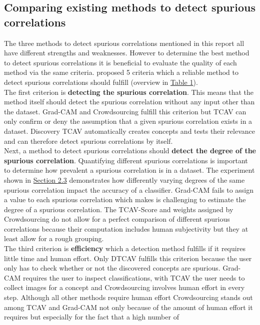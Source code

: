 \documentclass{article}
\begin{document}
\subsection{Comparing existing methods to detect spurious correlations}
The three methods to detect spurious correlations mentioned in this report all have different strengths and weaknesses.
However to determine the best method to detect spurious correlations it is beneficial to evaluate the quality of each method
via the same criteria. \cite{tong2020investigating} proposed 5 criteria which a reliable method to
detect spurious correlations should fulfill (overview in \hyperref[tab:comparison]{Table 1}).\\
The first criterion is \textbf{detecting the spurious correlation}. This means that the method itself should detect
the spurious correlation without any input other than the dataset. Grad-CAM and Crowdsourcing fulfill this criterion
but TCAV can only confirm or deny the assumption that a given spurious correlation exists in a dataset. Discovery TCAV automatically
creates concepts and tests their relevance and can therefore detect spurious correlations by itself.\\
Next, a method to detect spurious correlations should \textbf{detect the degree of the spurious correlation}.
Quantifying different spurious correlations is important to determine how prevalent a spurious correlation is in a dataset.
The experiment shown in \hyperref[sec:motivation]{Section 2.3} demonstrates how differently varying degrees of the same
spurious correlation impact the accuracy of a classifier. Grad-CAM fails to assign a value to each spurious correlation
which makes is challenging to estimate the degree of a spurious correlation. The TCAV-Score and weights assigned by
Crowdsourcing do not allow for a perfect comparison of different spurious correlations because their computation includes
human subjectivity but they at least allow for a rough grouping. \\
The third criterion is \textbf{efficiency} which a detection method fulfills if it requires little time and human effort.
Only DTCAV fulfills this criterion because the user only has to check whether or not the discovered concepts are spurious. 
Grad-CAM requires the user to inspect classifications, with TCAV the user needs to collect images for a concept and Crowdsourcing involves
human effort in every step. Although all other methods require human effort Crowdsourcing stands out among TCAV and Grad-CAM
not only because of the amount of human effort it requires but especially for the fact that a high number of
\end{document}

